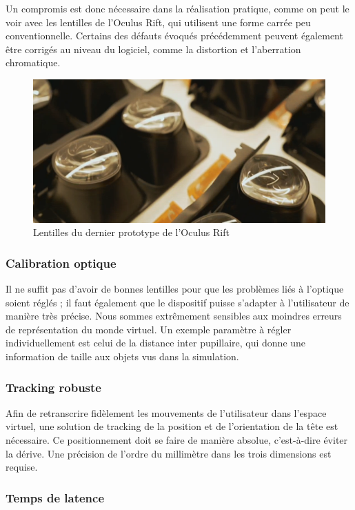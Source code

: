 \documentclass[a4,12pt]{scrartcl}
\begin{document}
Un compromis est donc nécessaire dans la réalisation pratique, comme on peut le voir avec les lentilles de l’Oculus Rift, qui utilisent une forme carrée peu conventionnelle. Certains des défauts évoqués précédemment peuvent également être corrigés au niveau du logiciel, comme la distortion et l’aberration chromatique.

\begin{figure}[H]
	\centering
	\includegraphics[width=0.7\linewidth]{crescent-bay-lens}
	\caption{Lentilles du dernier prototype de l’Oculus Rift}
\end{figure}

\subsubsection{Calibration optique}

Il ne suffit pas d’avoir de bonnes lentilles pour que les problèmes liés à l’optique soient réglés ; il faut également que le dispositif puisse s’adapter à l’utilisateur de manière très précise. Nous sommes extrêmement sensibles aux moindres erreurs de représentation du monde virtuel. Un exemple paramètre à régler individuellement est celui de la distance inter pupillaire, qui donne une information de taille aux objets vus dans la simulation.

\subsubsection{Tracking robuste}

Afin de retranscrire fidèlement les mouvements de l’utilisateur dans l’espace virtuel, une solution de tracking de la position et de l’orientation de la tête est nécessaire. Ce positionnement doit se faire de manière absolue, c’est-à-dire éviter la dérive. Une précision de l’ordre du millimètre dans les trois dimensions est requise.

\subsubsection{Temps de latence}
\end{document}

